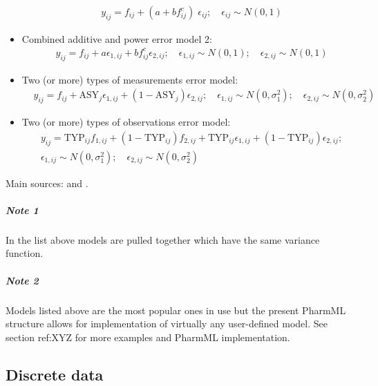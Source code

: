 \begin{itemize}
\begin{align*}
& y_{ij} =  f_{ij} + (a + b f_{ij}^c) \; \epsilon_{ij}; \quad \epsilon_{ij} \sim N(0,1)
\end{align*}
\item
Combined additive and power error model 2:
\begin{align*}
& y_{ij} = f_{ij} + a\epsilon_{1,ij} + b f_{ij}^c \epsilon_{2,ij}; \quad \epsilon_{1,ij} \sim N(0,1); \quad \epsilon_{2,ij} \sim N(0,1)
\end{align*}
\item
Two (or more) types of measurements error model:
\begin{align*}
& y_{ij} = f_{ij} + \text{ASY}_j\epsilon_{1,ij} + (1-\text{ASY}_j) \epsilon_{2,ij}; \quad \epsilon_{1,ij} \sim N(0,\sigma_1^2); \quad \epsilon_{2,ij} \sim N(0,\sigma_2^2)
\end{align*}
\item
Two (or more) types of observations error model:
\begin{align*}
& y_{ij} = \text{TYP}_{ij} f_{1,ij} + (1-\text{TYP}_{ij}) f_{2,ij} + \text{TYP}_{ij}\epsilon_{1,ij} + (1-\text{TYP}_{ij}) \epsilon_{2,ij};  \\
&  \epsilon_{1,ij} \sim N(0,\sigma_1^2); \quad \epsilon_{2,ij} \sim N(0,\sigma_2^2)
\end{align*}
%
%
\end{itemize}
Main sources: \cite{NONMEM:2006aa} and \cite{POPIX:2013}.

\subparagraph{Note 1}
In the list above models are pulled together which have the same variance function.
\subparagraph{Note 2}
Models listed above are the most popular ones in use but the present PharmML 
structure allows for implementation of virtually any user-defined model. See 
section ref:XYZ for more examples and PharmML implementation.

\subsection{Discrete data }
\label{subsec:DiscreteData}

